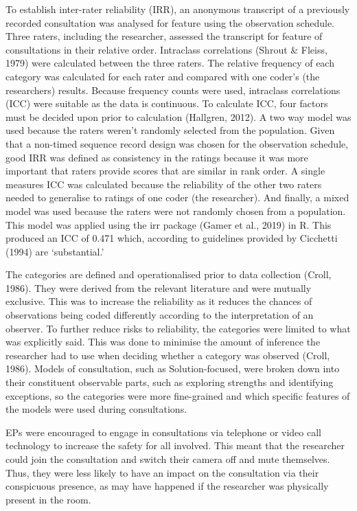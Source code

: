 \documentclass[
  english,
  man]{apa}
\begin{document}
To establish inter-rater reliability (IRR), an anonymous transcript of a previously recorded consultation was analysed for feature using the observation schedule. Three raters, including the researcher, assessed the transcript for feature of consultations in their relative order. Intraclass correlations (Shrout \& Fleiss, 1979) were calculated between the three raters. The relative frequency of each category was calculated for each rater and compared with one coder's (the researchers) results. Because frequency counts were used, intraclass correlations (ICC) were suitable as the data is continuous. To calculate ICC, four factors must be decided upon prior to calculation (Hallgren, 2012). A two way model was used because the raters weren't randomly selected from the population. Given that a non-timed sequence record design was chosen for the observation schedule, good IRR was defined as consistency in the ratings because it was more important that raters provide scores that are similar in rank order. A single measures ICC was calculated because the reliability of the other two raters needed to generalise to ratings of one coder (the researcher). And finally, a mixed model was used because the raters were not randomly chosen from a population. This model was applied using the irr package (Gamer et al., 2019) in R. This produced an ICC of 0.471 which, according to guidelines provided by Cicchetti (1994) are `substantial.'

The categories are defined and operationalised prior to data collection (Croll, 1986). They were derived from the relevant literature and were mutually exclusive. This was to increase the reliability as it reduces the chances of observations being coded differently according to the interpretation of an observer. To further reduce risks to reliability, the categories were limited to what was explicitly said. This was done to minimise the amount of inference the researcher had to use when deciding whether a category was observed (Croll, 1986). Models of consultation, such as Solution-focused, were broken down into their constituent observable parts, such as exploring strengths and identifying exceptions, so the categories were more fine-grained and which specific features of the models were used during consultations.

EPs were encouraged to engage in consultations via telephone or video call technology to increase the safety for all involved. This meant that the researcher could join the consultation and switch their camera off and mute themselves. Thus, they were less likely to have an impact on the consultation via their conspicuous presence, as may have happened if the researcher was physically present in the room.
\end{document}
